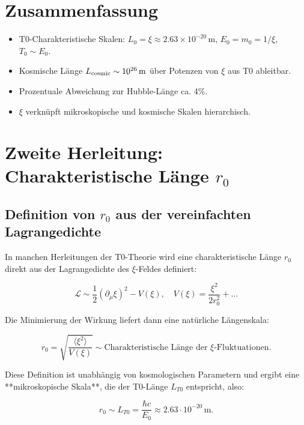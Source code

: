 \documentclass[12pt,a4paper]{article}
\begin{document}
	\section{Zusammenfassung}
	
	\begin{itemize}
		\item T0-Charakteristische Skalen: $L_0 = \xi \approx 2.63 \times 10^{-20}\,\text{m}$, $E_0 = m_0 = 1/\xi$, $T_0 \sim E_0$.
		\item Kosmische Länge $L_{\rm cosmic} \sim 10^{26}\,\text{m}$ über Potenzen von $\xi$ aus T0 ableitbar.
		\item Prozentuale Abweichung zur Hubble-Länge ca. 4\%.
		\item $\xi$ verknüpft mikroskopische und kosmische Skalen hierarchisch.
	\end{itemize}
\section{Zweite Herleitung: Charakteristische Länge $r_0$}

\subsection{Definition von $r_0$ aus der vereinfachten Lagrangedichte}

In manchen Herleitungen der T0-Theorie wird eine charakteristische Länge $r_0$ direkt aus der Lagrangedichte des $\xi$-Feldes definiert:

\begin{equation}
	\mathcal{L} \sim \frac{1}{2} (\partial_\mu \xi)^2 - V(\xi), \quad V(\xi) = \frac{\xi^2}{2 r_0^2} + \dots
\end{equation}

Die Minimierung der Wirkung liefert dann eine natürliche Längenskala:

\begin{equation}
	r_0 = \sqrt{\frac{\langle \xi^2 \rangle}{V(\xi)}} \sim \text{Charakteristische Länge der $\xi$-Fluktuationen}.
\end{equation}

Diese Definition ist unabhängig von kosmologischen Parametern und ergibt eine **mikroskopische Skala**, die der T0-Länge \(L_{T0}\) entspricht, also:

\begin{equation}
	r_0 \sim L_{T0} = \frac{\hbar c}{E_0} \approx 2.63 \cdot 10^{-20}\, \mathrm{m}.
\end{equation}
\end{document}
